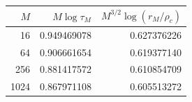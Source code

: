 \begin{tabular}{rrr}
\toprule
$M$ & $M\log\tau_M$ & $M^{3/2}\log(r_M/\rho_c)$ \\
\midrule
16 & 0.949469078 & 0.627376226 \\
64 & 0.906661654 & 0.619377140 \\
256 & 0.881417572 & 0.610854709 \\
1024 & 0.867971108 & 0.605513272 \\
\bottomrule
\end{tabular}

